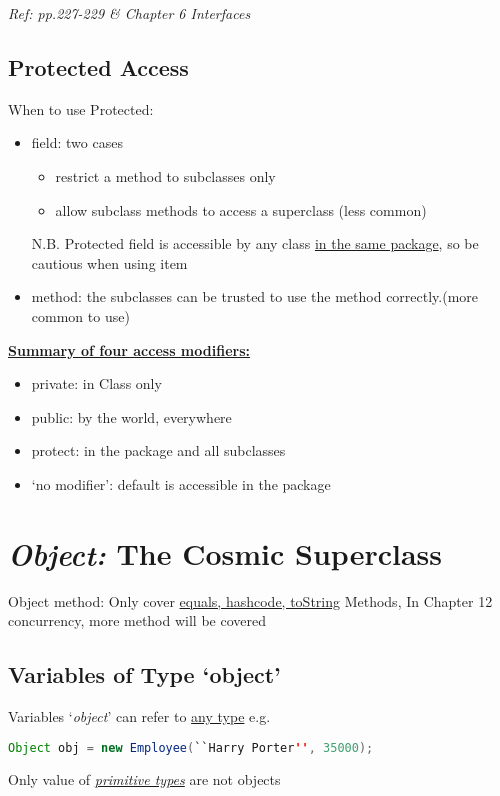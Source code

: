 \documentclass[12pt]{article}
\begin{document}
\textit{Ref: pp.227-229 \& Chapter 6 Interfaces}

\subsection{Protected Access}
When to use Protected:
\begin{itemize}
    \item field: two cases
    \begin{itemize}
        \item restrict a method to subclasses only
        \item allow subclass methods to access a superclass (less common)
    \end{itemize}
    N.B. Protected field is accessible by any class \underline{in the same package}, so be cautious when using item
    \item method: the subclasses can be trusted to use the method correctly.(more common to use)
\end{itemize}

\underline{\textbf{Summary of four access modifiers:}}
\begin{itemize}
    \item private: in Class only
    \item public: by the world, everywhere
    \item protect: in the package and all subclasses
    \item `no modifier': default is accessible in the package 
\end{itemize}

\section{\emph{Object:} The Cosmic Superclass}
Object method: Only cover \underline{equals, hashcode, toString} Methods, In Chapter 12 concurrency, more method will be covered

\subsection{Variables of Type `object'}
Variables `\emph{object}' can refer to \underline{any type} e.g.
\begin{lstlisting}[language=Java]
    Object obj = new Employee(``Harry Porter'', 35000);
\end{lstlisting}

Only value of \emph{\underline{primitive types}} are not objects
\end{document}
